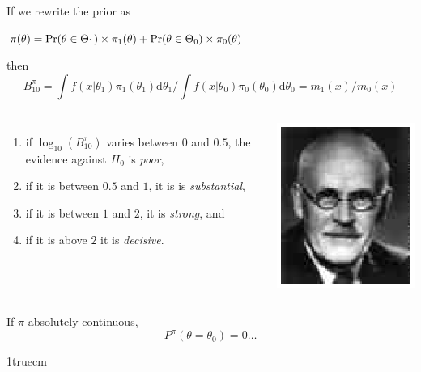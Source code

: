 \begin{slide}
\pause
If we rewrite the prior as 
\centerline{$\pi(\theta) = \hbox{Pr}(\theta\in\Theta_1)\times\pi_1(\theta) +
		\hbox{Pr}(\theta\in\Theta_0)\times\pi_0(\theta)$}
then
$$
B_{10}^\pi = { \displaystyle{\int f(x|\theta_1) \pi_1(\theta_1) \text{d}\theta_1} }\bigg/{
\displaystyle{\int f(x|\theta_0) \pi_0(\theta_0) \text{d}\theta_0} } = m_1(x)/m_0(x)
$$

\end{slide}\begin{slide}
\begin{columns}
\begin{enumerate}
   \item if $\log_{10} (B^\pi_{10})$ varies between $0$ and $0.5$,
           the evidence against $H_0$ is {\it poor},
   \item if it is between $0.5$ and $1$, it is is {\it substantial},
   \item if it is between $1$ and $2$, it is {\it strong}, and
   \item if it is above $2$ it is {\it decisive}.
\end{enumerate}
\includegraphics[height=3truecm]{figures/Jeffreys}
\end{columns}

\end{slide}\begin{slide}

If $\pi$ absolutely continuous, 
$$P^\pi(\theta=\theta_0)=0\ldots$$

\pause
\vglue 1truecm
\centerline{}


\end{slide}
